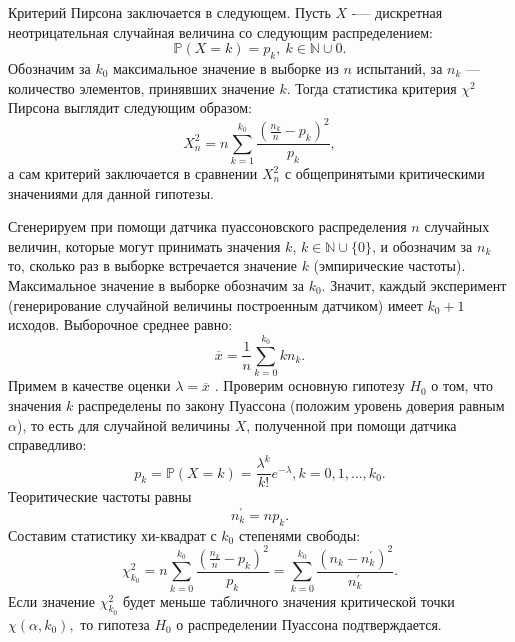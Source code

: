 \documentclass[11pt]{article}
\numberwithin{equation}{section}
\begin{document}
Критерий Пирсона заключается в следующем. Пусть $X$ -— дискретная неотрицательная случайная величина со следующим распределением:
$$ \mathbb{P}(X=k) =p_k, \ k \in \mathbb{N} \cup {0}.$$
Обозначим за $k_0$ максимальное значение в выборке из $n$ испытаний, за $n_k$ — количество элементов, принявших значение $k$. Тогда статистика критерия $\chi^2$ Пирсона выглядит следующим образом:
$$ X_n^2 = n \sum_{k=1}^{k_0} \frac{(\frac{n_k}{n} - p_k)^2}{p_k},$$
а сам критерий заключается в сравнении $X_n^2$ с общепринятыми критическими значениями для данной гипотезы.

Сгенерируем при помощи датчика пуассоновского распределения $n$
случайных величин, которые могут принимать значения $k$, $k \in \mathbb{N} \cup \{0\} $, и обозначим за $n_k$ то, сколько раз в выборке встречается значение $k$ (эмпирические частоты). Максимальное значение в выборке обозначим за $k_0$. Значит, каждый эксперимент (генерирование случайной величины построенным датчиком) имеет $k_0 + 1$ исходов. Выборочное среднее равно:
$$ \overline x = \frac{1}{n} \sum_{k=0}^{k_0}kn_k.$$ 
Примем в качестве оценки $\lambda = \overline{x}$ . Проверим основную гипотезу $H_0$ о том, что значения $k$ распределены по закону Пуассона (положим уровень доверия равным $\alpha$), то есть для случайной величины $X$, полученной при помощи датчика справедливо:
$$ p_k = \mathbb{P}(X=k) = \frac{\lambda^k}{k!}e^{-\lambda}, k= 0,1, \dots, k_0.$$
Теоритические частоты равны
$$ n_k^{'}=np_k.$$
Составим статистику хи-квадрат с $k_0$ степенями свободы:
$$ \chi_{k_0}^2=n\sum_{k=0}^{k_0} \frac{(\frac{n_k}{n}-p_k)^2} {p_k} = \sum_{k=0}^{k_0} \frac{(n_k-n_k^{'})^2}{n_k^{'}}.$$
Если значение $\chi_{k_0}^{2}$ будет меньше табличного значения критической точки $\chi(\alpha,k_0),$ то гипотеза 
$H_0$ о распределении Пуассона подтверждается.
\end{document}

